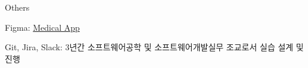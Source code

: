\begin{cvskills}
  \cvskill
    {Others} %
    {
      \begin{cvitems}
        \item {Figma: \href{https://www.figma.com/design/DY4l2tZ6kkIiZmN0NMk8Lo/Medical?node-id=0-1&t=JGXwtRfDt9z0oH3N-1}{\faFigma\space Medical App}}
        \item {Git, Jira, Slack: 3년간 소프트웨어공학 및 소프트웨어개발실무 조교로서 실습 설계 및 진행}
      \end{cvitems}
    } %

\end{cvskills}
